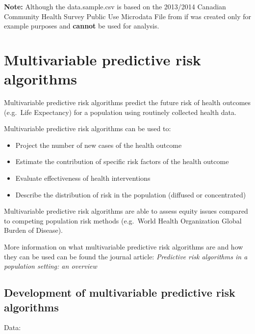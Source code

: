 \documentclass[]{book}
\providecommand{\tightlist}{%
  \setlength{\itemsep}{0pt}\setlength{\parskip}{0pt}}
\begin{document}
\textbf{Note:} Although the data.sample.csv is based on the 2013/2014
Canadian Community Health Survey Public Use Microdata File from if was
created only for example purposes and \textbf{cannot} be used for
analysis.

\section{Multivariable predictive risk
algorithms}\label{multivariable-predictive-risk-algorithms}

Multivariable predictive risk algorithms predict the future risk of
health outcomes (e.g.~Life Expectancy) for a population using routinely
collected health data.

Multivariable predictive risk algorithms can be used to:

\begin{itemize}
\tightlist
\item
  Project the number of new cases of the health outcome
\item
  Estimate the contribution of specific risk factors of the health
  outcome
\item
  Evaluate effectiveness of health interventions
\item
  Describe the distribution of risk in the population (diffused or
  concentrated)
\end{itemize}

Multivariable predictive risk algorithms are able to assess equity
issues compared to competing population risk methods (e.g.~World Health
Organization Global Burden of Disease).

More information on what multivariable predictive risk algorithms are
and how they can be used can be found the journal article:
\emph{Predictive risk algorithms in a population setting: an overview}
\citep{PoRTover}

\subsection{Development of multivariable predictive risk
algorithms}\label{development-of-multivariable-predictive-risk-algorithms}

Data:
\end{document}
